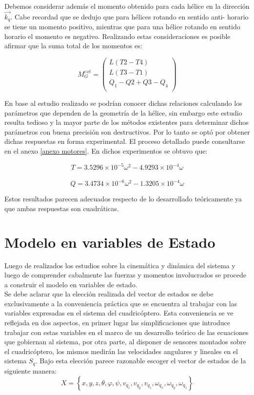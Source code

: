 \documentclass[main]{subfiles}
\begin{document}
Debemos considerar adem\'as el momento obtenido para cada h\'elice en la direcci\'on $\vec{k_q}$. Cabe recordad que se dedujo que para h\'elices rotando en sentido anti- horario se tiene un momento positivo, mientras que para una h\'elice rotando en sentido horario el momento es negativo. Realizando estas consideraciones es posible afirmar que la suma total de los momentos es:

$$M_G^{ext} = \left(\begin{array}{c}
L(T2-T4)\\
L(T3-T1)\\
Q_1-Q2+Q3-Q_4\\
\end{array} \right)$$

En base al estudio realizado se podr\'ian conocer dichas relaciones calculando los par\'ametros que dependen de la geometr\'ia de la h\'elice, sin embargo este estudio resulta tedioso y la mayor parte de los m\'etodos existentes para determinar dichos par\'ametros con buena precisi\'on son destructivos. Por lo tanto se opt\'o por obtener dichas respuestas en forma experimental. El proceso detallado puede consultarse en el anexo \ref{anexo motores}. En dichos experimentos se obtuvo que:

$$
T=3.5296\times 10^{-5}\omega^2-4.9293\times 10^{-4}\omega
$$\\$$Q= 3.4734\times 10^{-6}\omega^2-1.3205\times 10^{-4}\omega $$

Estos resultados parecen adecuados respecto de lo desarrollado te\'oricamente ya que ambas respuestas son cuadr\'aticas. 

\section{Modelo en variables de Estado}

Luego de realizados los estudios sobre la cinem\'atica y din\'amica del sistema y luego de comprender cabalmente las fuerzas y momentos involucrados se procede a construir el modelo en variables de estado.\\ 

Se debe aclarar que la elecci\'on realizada del vector de estados se debe exclusivamente a la conveniencia pr\'actica que se encuentra al trabajar con las variables expresadas en el sistema del cuadric\'optero. Esta conveniencia se ve reflejada en dos aspectos, en primer lugar las simplificaciones que introduce trabajar con estas variables en el marco de un desarrollo te\'orico de las ecuaciones que gobiernan al sistema, por otra parte, al disponer de sensores montados sobre el cuadric\'optero, los mismos medir\'an las velocidades angulares y lineales en el sistema $S_q$. Bajo esta elecci\'on parece razonable escoger el vector de estados de la siguiente manera:
$$X=\left\lbrace  x,y,z, \theta,\varphi,\psi, v_{q_z},v_{q_y},v_{q_z},\omega_{q_x},\omega_{q_y},\omega_{q_z} \right\rbrace$$
\end{document}
